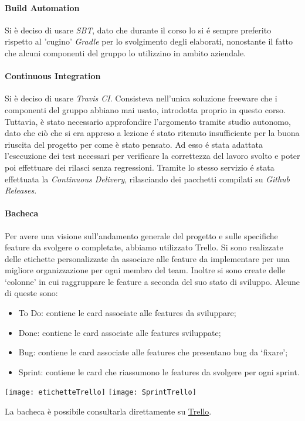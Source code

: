 \paragraph{Build Automation}
Si è deciso di usare \textit{SBT}, dato che durante il corso lo si é sempre preferito rispetto al 'cugino' \textit{Gradle} per lo svolgimento degli elaborati, nonostante il fatto che alcuni componenti del gruppo lo utilizzino in ambito aziendale.

\paragraph{Continuous Integration}
Si è deciso di usare \textit{Travis CI}.
Consisteva nell'unica soluzione freeware che i componenti del gruppo abbiano mai usato, introdotta proprio in questo corso.
Tuttavia, è stato necessario approfondire l'argomento tramite studio autonomo, dato che ciò che si era appreso a lezione é stato ritenuto insufficiente per la buona riuscita del progetto per come è stato pensato.
Ad esso é stata adattata l'esecuzione dei test necessari per verificare la correttezza del lavoro svolto e poter poi effettuare dei rilasci senza regressioni.
Tramite lo stesso servizio é stata effettuata la \textit{Continuous Delivery}, rilasciando dei pacchetti compilati su \textit{Github Releases}.

\paragraph{Bacheca}
Per avere una visione sull’andamento generale del progetto e sulle specifiche feature da svolgere o completate, abbiamo utilizzato Trello.
Si sono realizzate delle etichette personalizzate da associare alle feature da implementare per una migliore organizzazione per ogni membro del team.
Inoltre si sono create delle ‘colonne’ in cui raggruppare le feature a seconda del suo stato di sviluppo.
Alcune di queste sono:
\begin{itemize}
    \item To Do: contiene le card associate alle features da sviluppare;
    \item Done: contiene le card associate alle features sviluppate;
    \item Bug: contiene le card associate alle features che presentano bug da ‘fixare’;
    \item Sprint: contiene le card che riassumono le features da svolgere per ogni sprint.
\end{itemize}
\begin{center}
    \texttt{[image: etichetteTrello]}
    \texttt{[image: SprintTrello]}
\end{center}
La bacheca è possibile consultarla direttamente su \href{https://trello.com/b/Nk4j3Kuf/pps}{Trello}.

